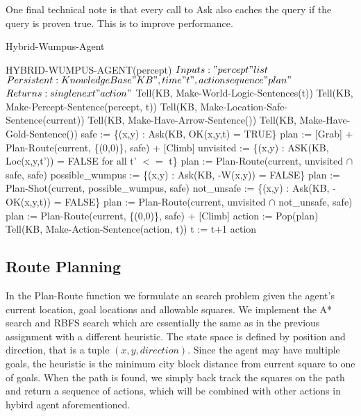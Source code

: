 One final technical note is that every call to Ask also caches the query if the query is proven true. This is to improve performance.

\begin{algorithm}[H]
\caption{Hybrid-Wumpus-Agent}
\label{hybridalg}
\begin{algorithmic}
\STATE HYBRID-WUMPUS-AGENT(percept)
\STATE $Inputs: "percept" list$
\STATE $Persistent: Knowledge Base "KB", time "t", action sequence "plan"$
\STATE $Returns: single next "action"$
\STATE Tell(KB, Make-World-Logic-Sentences(t))
\STATE Tell(KB, Make-Percept-Sentence(percept, t))
\STATE Tell(KB, Make-Location-Safe-Sentence(current))
\STATE Tell(KB, Make-Have-Arrow-Sentence())
\STATE Tell(KB, Make-Have-Gold-Sentence())
\STATE safe := \{(x,y) : Ask(KB, OK(x,y,t) = TRUE\}
	\STATE plan := {[}Grab{]} + Plan-Route(current, \{(0,0)\}, safe) + {[}Climb{]}
\ENDIF
{}
	\STATE unvisited := \{(x,y) : ASK(KB, Loc(x,y,t')) = FALSE for all t' $<=$ t\}
	\STATE plan := Plan-Route(current, unvisited $\cap$ safe, safe)
\ENDIF
{}
	\STATE possible\_wumpus := \{(x,y) : Ask(KB, -W(x,y)) = FALSE\}
	\STATE plan := Plan-Shot(current, possible\_wumpus, safe)
\ENDIF
{}
	\STATE not\_unsafe := \{(x,y) : Ask(KB, -OK(x,y,t)) = FALSE\}
	\STATE plan := Plan-Route(current, unvisited $\cap$ not\_unsafe, safe)
\ENDIF
{}
	\STATE plan := Plan-Route(current, \{(0,0)\}, safe) + {[}Climb{]}
\ENDIF
\STATE action := Pop(plan)
\STATE Tell(KB, Make-Action-Sentence(action, t))
\STATE t := t+1
\RETURN action
\end{algorithmic}
\end{algorithm}

\subsection{Route Planning}

In the Plan-Route function we formulate an search problem given the agent's current location, goal locations and allowable squares. We implement the A* search and RBFS search which are essentially the same as in the previous assignment with a different heuristic. The state space is defined by position and direction, that is a tuple $(x,y,direction)$. Since the agent may have multiple goals, the heuristic is the minimum city block distance from current square to one of goals. When
the path is found, we simply back track the squares on the path and return a sequence of actions, which will be combined with other actions in hybird agent aforementioned.

